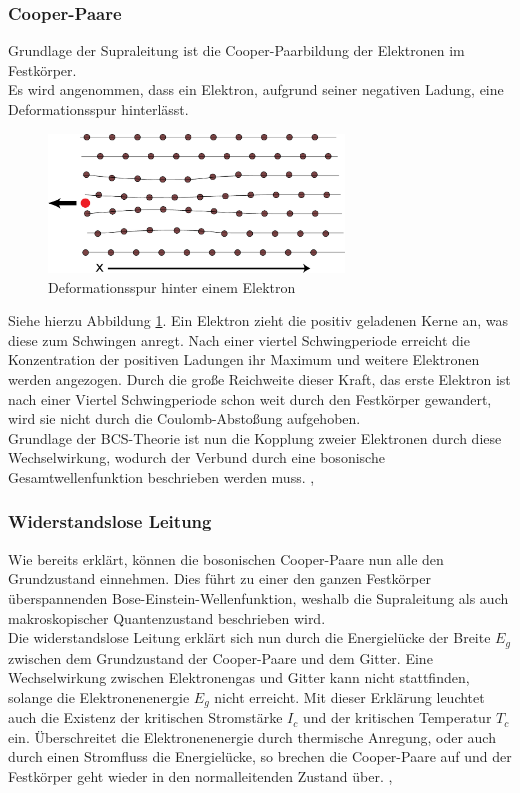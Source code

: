         \subsubsection{Cooper-Paare}
Grundlage der Supraleitung ist die Cooper-Paarbildung der Elektronen im Festkörper.
\vspace{3pt}\\
Es wird angenommen, dass ein Elektron, aufgrund seiner negativen Ladung, eine 
Deformationsspur hinterlässt. 
\begin{figure}[h]
    \centering
    \includegraphics[width=0.7\textwidth]{Abb/deformation.pdf}
    \caption{Deformationsspur hinter einem Elektron \cite{bcswiki}}
    \label{Abb:def}
\end{figure}
Siehe hierzu Abbildung \ref{Abb:def}. Ein Elektron zieht die positiv geladenen Kerne
an, was diese zum Schwingen anregt. Nach einer viertel Schwingperiode erreicht die
Konzentration der positiven Ladungen ihr Maximum und weitere Elektronen werden 
angezogen. Durch die große Reichweite dieser Kraft, das erste Elektron ist nach
einer Viertel Schwingperiode schon weit durch den Festkörper gewandert, wird sie
nicht durch die Coulomb-Abstoßung aufgehoben.
\vspace{3pt}\\
Grundlage der BCS-Theorie ist nun die Kopplung zweier Elektronen durch diese 
Wechselwirkung, wodurch der Verbund durch eine bosonische Gesamtwellenfunktion
beschrieben werden muss. \cite{bcswiki}, \cite{hunklinger}

		\subsubsection{Widerstandslose Leitung}
Wie bereits erklärt, können die bosonischen Cooper-Paare nun alle den Grundzustand
einnehmen. Dies führt zu einer den ganzen Festkörper überspannenden 
Bose-Einstein-Wellenfunktion, weshalb die Supraleitung als auch makroskopischer
Quantenzustand beschrieben wird. \\
Die widerstandslose Leitung erklärt sich nun durch die Energielücke der Breite 
$E_g$ zwischen dem Grundzustand der Cooper-Paare und dem Gitter. Eine Wechselwirkung
zwischen Elektronengas und Gitter kann nicht stattfinden, solange die 
Elektronenenergie $E_g$ nicht erreicht. Mit dieser Erklärung leuchtet auch die 
Existenz der kritischen Stromstärke $I_c$ und der kritischen Temperatur $T_c$ ein.
Überschreitet die Elektronenenergie durch thermische Anregung, oder auch durch
einen Stromfluss die Energielücke, so brechen die Cooper-Paare auf und der 
Festkörper geht wieder in den normalleitenden Zustand über. \cite{hunklinger}, 
\cite{suprawiki}

